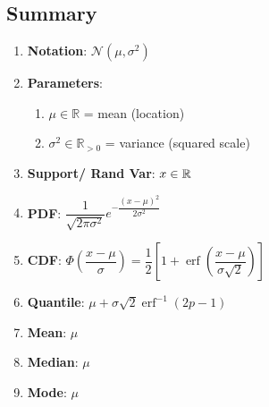 \subsection{Summary}

\begin{enumerate}

    \item
    \textbf{Notation}:
    $
        {\displaystyle {\mathcal {N}}(\mu ,\sigma ^{2})}
    $
    \hfill \cite{wiki/Normal_distribution}

    \item
    \textbf{Parameters}:
    \begin{enumerate}
        \item ${\displaystyle \mu \in \mathbb {R} }$ = mean (location)
        \hfill \cite{wiki/Normal_distribution}

        \item ${\displaystyle \sigma ^{2}\in \mathbb {R} _{>0}}$ = variance (squared scale)
        \hfill \cite{wiki/Normal_distribution}
    \end{enumerate}

    \item
    \textbf{Support/ Rand Var}:
    $x \in \mathbb{R}$
    \hfill \cite{wiki/Normal_distribution}

    \item
    \textbf{PDF}:
    $ {\displaystyle {\dfrac {1}{\sqrt {2\pi \sigma ^{2}}}}e^{-{\dfrac {(x-\mu )^{2}}{2\sigma ^{2}}}}} $
    \hfill\cite{wiki/Normal_distribution}

    \item
    \textbf{CDF}:
    $ {\displaystyle \Phi \left({\dfrac {x-\mu }{\sigma }}\right)={\dfrac {1}{2}}\left[1+\operatorname {erf} \left({\dfrac {x-\mu }{\sigma {\sqrt {2}}}}\right)\right]} $
    \hfill\cite{wiki/Normal_distribution}

    \item
    \textbf{Quantile}:
    $ {\displaystyle \mu +\sigma {\sqrt {2}}\operatorname {erf} ^{-1}(2p-1)} $
    \hfill\cite{wiki/Normal_distribution}

    \item
    \textbf{Mean}:
    $ {\displaystyle \mu } $
    \hfill\cite{wiki/Normal_distribution}

    \item
    \textbf{Median}:
    $ {\displaystyle \mu } $
    \hfill\cite{wiki/Normal_distribution}

    \item
    \textbf{Mode}:
    $ {\displaystyle \mu } $
    \hfill\cite{wiki/Normal_distribution}


\end{enumerate}
